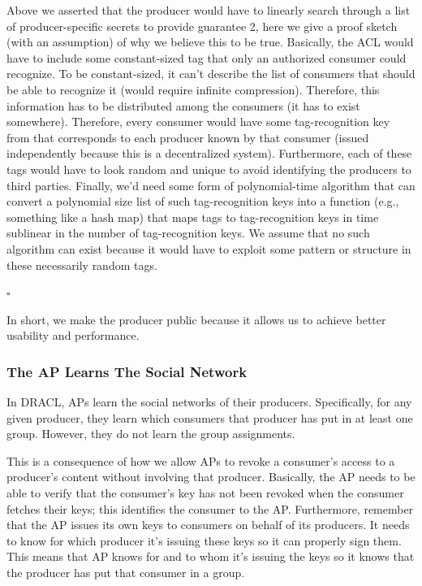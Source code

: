 \documentclass[pdftex,12pt,a4papaer,twoside,notitlepage]{report}
\begin{document}
Above we asserted that the producer would have to linearly search through a list
of producer-specific secrets to provide guarantee 2, here we give a proof sketch
(with an assumption) of why we believe this to be true. Basically, the ACL would
have to include some constant-sized tag that only an authorized consumer could
recognize. To be constant-sized, it can't describe the list of consumers that
should be able to recognize it (would require infinite compression). Therefore,
this information has to be distributed among the consumers (it has to exist
somewhere). Therefore, every consumer would have some tag-recognition key from
that corresponds to each producer known by that consumer (issued independently
because this is a decentralized system). Furthermore, each of these tags would
have to look random and unique to avoid identifying the producers to third
parties. Finally, we'd need some form of polynomial-time algorithm that can
convert a polynomial size list of such tag-recognition keys into a function
(e.g., something like a hash map) that maps tags to tag-recognition keys in time
sublinear in the number of tag-recognition keys. We assume that no such
algorithm can exist because it would have to exploit some pattern or structure
in these necessarily random tags.

{\hfill $\square$}

In short, we make the producer public because it allows us to achieve better
usability and performance.

\subsubsection{The AP Learns The Social Network}
\label{sub:ap_learns_network}

In DRACL, APs learn the social networks of their producers. Specifically,
for any given producer, they learn which consumers that producer has put in at
least one group. However, they do not learn the group assignments.

This is a consequence of how we allow APs to revoke a consumer's access to a
producer's content without involving that producer. Basically, the AP needs to
be able to verify that the consumer's key has not been revoked when the consumer
fetches their keys; this identifies the consumer to the AP. Furthermore,
remember that the AP issues its own keys to consumers on behalf of its
producers. It needs to know for which producer it's issuing these keys so it can
properly sign them. This means that AP knows for and to whom it's issuing the
keys so it knows that the producer has put that consumer in a group.
\end{document}
